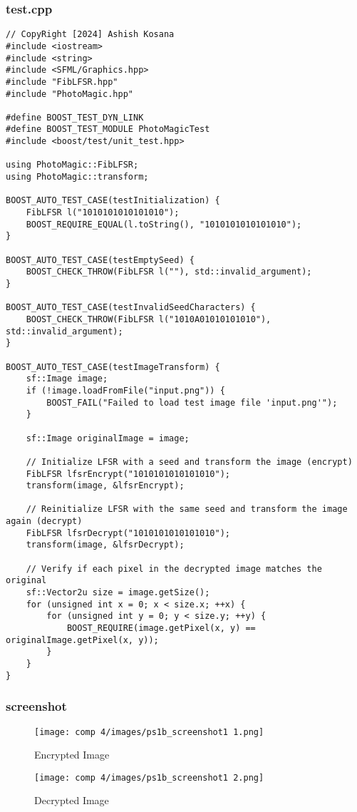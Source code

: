 \documentclass[12pt]{article}
\begin{document}
\subsubsection{test.cpp}
\begin{lstlisting}[style=cppcode]
// CopyRight [2024] Ashish Kosana
#include <iostream>
#include <string>
#include <SFML/Graphics.hpp>
#include "FibLFSR.hpp"
#include "PhotoMagic.hpp"

#define BOOST_TEST_DYN_LINK
#define BOOST_TEST_MODULE PhotoMagicTest
#include <boost/test/unit_test.hpp>

using PhotoMagic::FibLFSR;
using PhotoMagic::transform;

BOOST_AUTO_TEST_CASE(testInitialization) {
    FibLFSR l("1010101010101010");
    BOOST_REQUIRE_EQUAL(l.toString(), "1010101010101010");
}

BOOST_AUTO_TEST_CASE(testEmptySeed) {
    BOOST_CHECK_THROW(FibLFSR l(""), std::invalid_argument);
}

BOOST_AUTO_TEST_CASE(testInvalidSeedCharacters) {
    BOOST_CHECK_THROW(FibLFSR l("1010A01010101010"), std::invalid_argument);
}

BOOST_AUTO_TEST_CASE(testImageTransform) {
    sf::Image image;
    if (!image.loadFromFile("input.png")) {
        BOOST_FAIL("Failed to load test image file 'input.png'");
    }

    sf::Image originalImage = image;

    // Initialize LFSR with a seed and transform the image (encrypt)
    FibLFSR lfsrEncrypt("1010101010101010");
    transform(image, &lfsrEncrypt);

    // Reinitialize LFSR with the same seed and transform the image again (decrypt)
    FibLFSR lfsrDecrypt("1010101010101010");
    transform(image, &lfsrDecrypt);

    // Verify if each pixel in the decrypted image matches the original
    sf::Vector2u size = image.getSize();
    for (unsigned int x = 0; x < size.x; ++x) {
        for (unsigned int y = 0; y < size.y; ++y) {
            BOOST_REQUIRE(image.getPixel(x, y) == originalImage.getPixel(x, y));
        }
    }
}

\end{lstlisting}
\newpage
\subsubsection{screenshot}
\begin{figure}[tbh]
	\centering
	\texttt{[image: comp 4/images/ps1b\_screenshot1 1.png]}
	\caption{Encrypted Image}

\texttt{[image: comp 4/images/ps1b\_screenshot1 2.png]}
\caption{Decrypted Image}
	
\end{figure}
\end{document}
